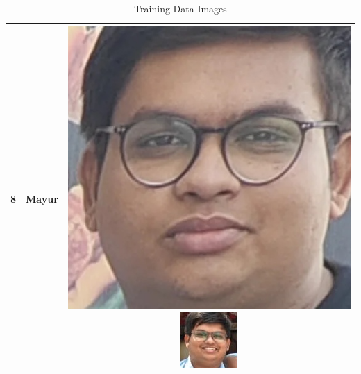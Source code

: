 \documentclass[openany]{report}
\begin{document}
\begin{table}[H]
\begin{tabular}{|c|c|c|}
        \hline
        8                      & Mayur         & \includegraphics[height=.15\textwidth]{../imgs/mayur (13).jpg}
        \includegraphics[height=.15\textwidth]{../imgs/mayur (1).jpg}
        \\
        \hline
    \end{tabular}
    \caption{Training Data Images}
\end{table}
\end{document}
